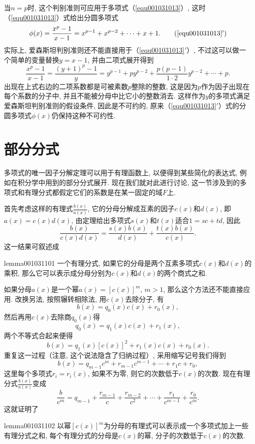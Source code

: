 当$n=p$时, 这个判别准则可应用于多项式（\ref{equ001031013}）, 这时（\ref{equ001031013}）式给出分圆多项式
\begin{equation}
\phi(x)=\frac{x^p-1}{x-1}=x^{p-1}+x^{p-2}+\cdots +x+1. \tag{\ref{equ001031013}$'$}
\end{equation}
实际上, 爱森斯坦判别准则还不能直接用于（\ref{equ001031013}$'$）, 不过这可以做一个简单的变量替换$y = x - 1$, 并由二项式展开得到
\[
\frac{x^p-1}{x-1} = \frac{(y+1)^p-1}{y} = y^{p-1} + py^{p-2} + \frac{p(p-1)}{1 \cdot 2}y^{p-2} + \cdots + p.
\]
出现在上式右边的二项系数都是可被素数$p$整除的整数, 这是因为$p$作为因子出现在每个系数的分子中, 并且不能被分母中比它小的整数消去. 这样作为$y$的多项式满足爱森斯坦判别准则的假设条件, 因此是不可约的, 原来（\ref{equ001031013}$'$）式的分圆多项式$\phi(x)$仍保持这种不可约性. 


\section{部分分式}\label{section0010311}
多项式的唯一因子分解定理可以用于有理函数上, 以便得到某些简化的表达式, 例如在积分学中用到的部分分式展开. 现在我们就对此进行讨论, 这一节涉及到的多项式和有理分式都假定它们的系数是在某一固定的域$F$上. 

首先考虑这样的有理式$\frac{b(x)}{a(x)}$, 它的分母分解成互素的因子$c(x)$和$d(x)$, 即$a(x)=c(x)d(x)$, 由定理给出多项式$s(x)$和$t(x)$适合$1 = sc+td$, 因此
\begin{equation}\label{equ001031114}
\frac{b(x)}{c(x)d(x)} = \frac{s(x)b(x)}{d(x)} + \frac{t(x)b(x)}{c(x)}.
\end{equation}
这一结果可叙述成
\begin{lemma}{}{lemma001031101}
一个有理分式, 如果它的分母是两个互素多项式$c(x)$和$d(x)$的乘积, 那么它可以表示成分母分别为$c(x)$和$d(x)$的两个商式之和. 
\end{lemma}

如果分母$a(x)$是一个幂$a(x)=[c(x)]^m$, $m>1$, 那么这个方法还不能直接应用. 改换另法, 按照辗转相除法, 用$c(x)$去除分子, 有
\[
b(x)=q_0(x)c(x)+r_0(x),
\]
然后再用$c(x)$去除商$q_0(x)$得
\[
q_0(x)=q_1(x)c(x)+r_1(x),
\]
两个不等式合起来便得
\[
b(x) = q_1(x)[c(x)]^2 + r_1(x)c(x)+r_0(x).
\]
重复这一过程（注意, 这个说法隐含了归纳过程）, 采用缩写记号我们得到
\begin{equation}\label{equ001031115}
b(x) = q_{m-1}c^m + r_{m-1}c^{m-1} + \cdots + r_1c + r_0,
\end{equation}
这里每个多项式$r_i = r_i(x)$, 如果不为零, 则它的次数低于$c(x)$的次数. 现在有理分式$\frac{b(x)}{a(x)}$变成
\begin{equation}\label{equ00103116}
\frac{b}{c^m} = q_{m-1} + \frac{r_{m-1}}{c} + \frac{r_{m-2}}{c^2} + \cdots + \frac{r_1}{c^{m-1}} + \frac{r_0}{c^m}.
\end{equation}
这就证明了
\begin{lemma}{}{lemma001031102}
以幂$[c(x)]^m$为分母的有理式可以表示成一个多项式加上一些有理分式之和, 每个有理分式的分母是$c(x)$的幂, 分子的次数低于$c(x)$的次数. 
\end{lemma}

